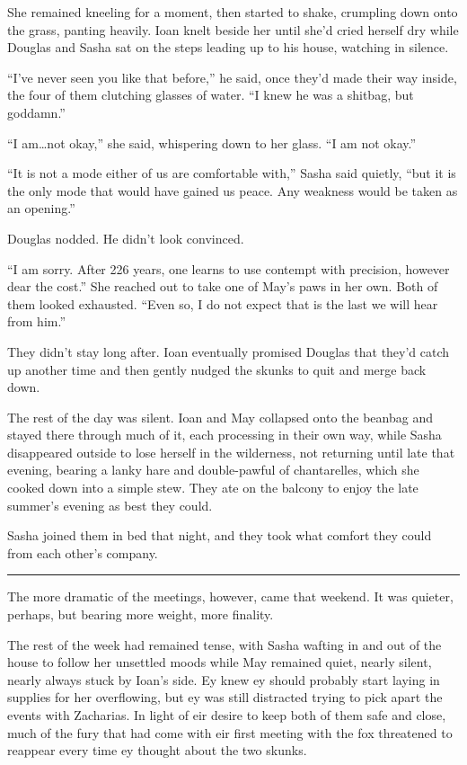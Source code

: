 She remained kneeling for a moment, then started to shake, crumpling down onto the grass, panting heavily. Ioan knelt beside her until she'd cried herself dry while Douglas and Sasha sat on the steps leading up to his house, watching in silence.

``I've never seen you like that before,'' he said, once they'd made their way inside, the four of them clutching glasses of water. ``I knew he was a shitbag, but goddamn.''

``I am\ldots not okay,'' she said, whispering down to her glass. ``I am not okay.''

``It is not a mode either of us are comfortable with,'' Sasha said quietly, ``but it is the only mode that would have gained us peace. Any weakness would be taken as an opening.''

Douglas nodded. He didn't look convinced.

``I am sorry. After 226 years, one learns to use contempt with precision, however dear the cost.'' She reached out to take one of May's paws in her own. Both of them looked exhausted. ``Even so, I do not expect that is the last we will hear from him.''

They didn't stay long after. Ioan eventually promised Douglas that they'd catch up another time and then gently nudged the skunks to quit and merge back down.

The rest of the day was silent. Ioan and May collapsed onto the beanbag and stayed there through much of it, each processing in their own way, while Sasha disappeared outside to lose herself in the wilderness, not returning until late that evening, bearing a lanky hare and double-pawful of chantarelles, which she cooked down into a simple stew. They ate on the balcony to enjoy the late summer's evening as best they could.

Sasha joined them in bed that night, and they took what comfort they could from each other's company.

\begin{center}\rule{0.5\linewidth}{0.5pt}\end{center}

The more dramatic of the meetings, however, came that weekend. It was quieter, perhaps, but bearing more weight, more finality.

The rest of the week had remained tense, with Sasha wafting in and out of the house to follow her unsettled moods while May remained quiet, nearly silent, nearly always stuck by Ioan's side. Ey knew ey should probably start laying in supplies for her overflowing, but ey was still distracted trying to pick apart the events with Zacharias. In light of eir desire to keep both of them safe and close, much of the fury that had come with eir first meeting with the fox threatened to reappear every time ey thought about the two skunks.

